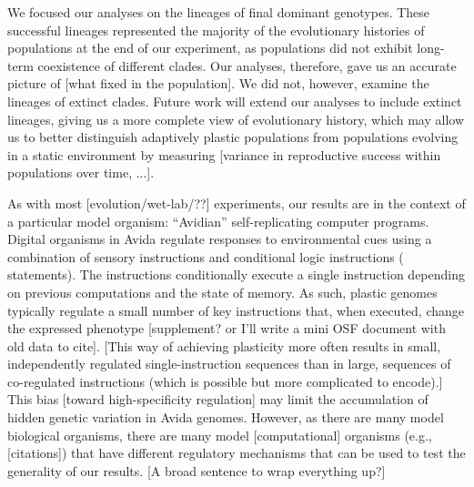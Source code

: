 We focused our analyses on the lineages of final dominant genotypes.
These successful lineages represented the majority of the evolutionary histories of populations at the end of our experiment, as populations did not exhibit long-term coexistence of different clades.
Our analyses, therefore, gave us an accurate picture of [what fixed in the population].
We did not, however, examine the lineages of extinct clades.
Future work will extend our analyses to include extinct lineages, giving us a more complete view of evolutionary history, which may allow us to better distinguish adaptively plastic populations from populations evolving in a static environment by measuring [variance in reproductive success within populations over time, ...].

As with most [evolution/wet-lab/??] experiments, our results are in the context of a particular model organism: ``Avidian'' self-replicating computer programs.
Digital organisms in Avida regulate responses to environmental cues using a combination of sensory instructions and conditional logic instructions ( statements).
The  instructions conditionally execute a single instruction depending on previous computations and the state of memory.  
As such, plastic genomes typically regulate a small number of key instructions that, when executed, change the expressed phenotype [supplement? or I'll write a mini OSF document with old data to cite].
[This way of achieving plasticity more often results in 
small, independently regulated single-instruction sequences 
than in
large, sequences of co-regulated instructions (which is possible but more complicated to encode).]
This bias [toward high-specificity regulation] may limit the accumulation of hidden genetic variation in Avida genomes. 
However, as there are many model biological organisms, there are many model [computational] organisms (e.g., [citations]) that have different regulatory mechanisms that can be used to test the generality of our results.
[A broad sentence to wrap everything up?]

